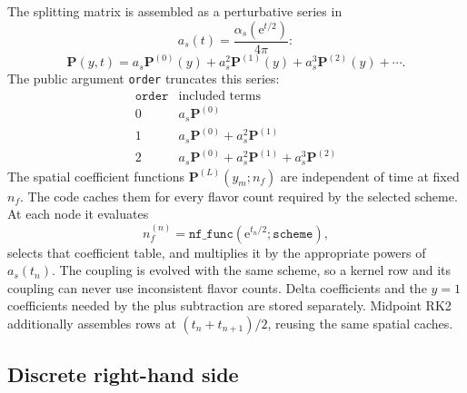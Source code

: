 \documentclass[11pt]{article}
\newcommand{\ee}{\mathrm{e}}
\newcommand{\as}{a_s}
\newcommand{\Pmat}{\bm P}
\begin{document}
The splitting matrix is assembled as a perturbative series in
\begin{equation}
  \as(t)=\frac{\alpha_s(\ee^{t/2})}{4\pi}:
\end{equation}
\begin{equation}
  \Pmat(y,t)
  =
  \as\Pmat^{(0)}(y)
  +\as^2\Pmat^{(1)}(y)
  +\as^3\Pmat^{(2)}(y)+\cdots.
  \label{eq:perturbative-series}
\end{equation}
The public argument \texttt{order} truncates this series:
\begin{equation}
\begin{array}{c|l}
\texttt{order} & \text{included terms}\\
\hline
0 & \as\Pmat^{(0)}\\
1 & \as\Pmat^{(0)}+\as^2\Pmat^{(1)}\\
2 & \as\Pmat^{(0)}+\as^2\Pmat^{(1)}+\as^3\Pmat^{(2)}
\end{array}
\label{eq:order-map}
\end{equation}
The spatial coefficient functions \(\Pmat^{(L)}(y_m;n_f)\) are independent of
time at fixed \(n_f\). The code caches them for every flavor count required by
the selected scheme. At each node it evaluates
\[
  n_f^{(n)}=\texttt{nf\_func}(\ee^{t_n/2};\texttt{scheme}),
\]
selects that coefficient table, and multiplies it by the appropriate powers
of \(\as(t_n)\). The coupling is evolved with the same scheme, so a kernel row
and its coupling can never use inconsistent flavor counts. Delta coefficients
and the \(y=1\) coefficients needed by the plus subtraction are stored
separately. Midpoint RK2 additionally assembles rows at
\((t_n+t_{n+1})/2\), reusing the same spatial caches.

\subsection{Discrete right-hand side}
\end{document}
